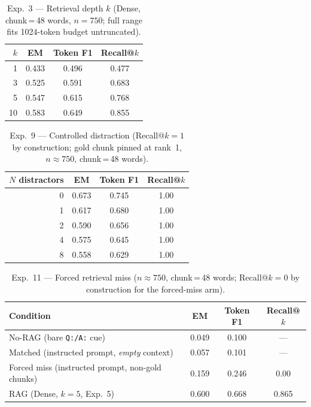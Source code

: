 \documentclass{article}
\begin{document}
\begin{table}[h]
\centering
\caption{Exp.~3 --- Retrieval depth $k$ (Dense, chunk\,=\,48 words,
  $n\!=\!750$; full range fits 1024-token budget untruncated).}
\small
\begin{tabular}{rccc}
\toprule
$k$ & EM & Token F1 & Recall@$k$ \\
\midrule
1  & 0.433 & 0.496 & 0.477 \\
3  & 0.525 & 0.591 & 0.683 \\
5  & 0.547 & 0.615 & 0.768 \\
10 & 0.583 & 0.649 & 0.855 \\
\bottomrule
\end{tabular}
\end{table}

\begin{table}[h]
\centering
\caption{Exp.~9 --- Controlled distraction (Recall@$k\!=\!1$ by
  construction; gold chunk pinned at rank~1, $n\!\approx\!750$,
  chunk\,=\,48 words).}
\small
\begin{tabular}{rccc}
\toprule
$N$ distractors & EM & Token F1 & Recall@$k$ \\
\midrule
0 & 0.673 & 0.745 & 1.00 \\
1 & 0.617 & 0.680 & 1.00 \\
2 & 0.590 & 0.656 & 1.00 \\
4 & 0.575 & 0.645 & 1.00 \\
8 & 0.558 & 0.629 & 1.00 \\
\bottomrule
\end{tabular}
\end{table}

\begin{table}[h]
\centering
\caption{Exp.~11 --- Forced retrieval miss ($n\!\approx\!750$,
  chunk\,=\,48 words; Recall@$k\!=\!0$ by construction for the
  forced-miss arm).}
\small
\begin{tabular}{lccc}
\toprule
Condition & EM & Token F1 & Recall@$k$ \\
\midrule
No-RAG (bare \texttt{Q:/A:} cue) & 0.049 & 0.100 & --- \\
Matched (instructed prompt, \emph{empty} context) & 0.057 & 0.101 & --- \\
Forced miss (instructed prompt, non-gold chunks) & 0.159 & 0.246 & 0.00 \\
RAG (Dense, $k\!=\!5$, Exp.~5) & 0.600 & 0.668 & 0.865 \\
\bottomrule
\end{tabular}
\end{table}
\end{document}
